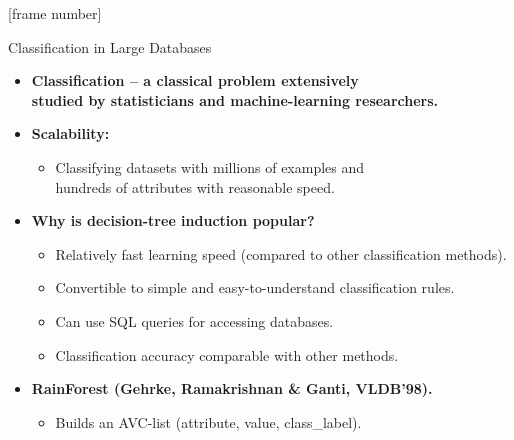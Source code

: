 \documentclass[aspectratio=169,t,table]{beamer}
\begin{document}
  {
    [frame number]
    \begin{frame}{Classification in Large Databases}
      \begin{itemize}
        \item \textbf{Classification -- a classical problem extensively \\ studied by statisticians and machine-learning researchers.}
        \item \textbf{Scalability:}
        \begin{itemize}
          \item Classifying datasets with millions of examples and \\ hundreds of attributes with reasonable speed.
        \end{itemize}
        \item \textbf{Why is decision-tree induction popular?}
        \begin{itemize}
          \item Relatively fast learning speed (compared to other classification methods).
          \item Convertible to simple and easy-to-understand classification rules.
          \item Can use SQL queries for accessing databases.
          \item Classification accuracy comparable with other methods.
        \end{itemize}
        \item \textbf{RainForest (Gehrke, Ramakrishnan \& Ganti, VLDB'98).}
        \begin{itemize}
          \item Builds an AVC-list (attribute, value, class\_label).
        \end{itemize}
      \end{itemize}
    \end{frame}
  }
\end{document}
